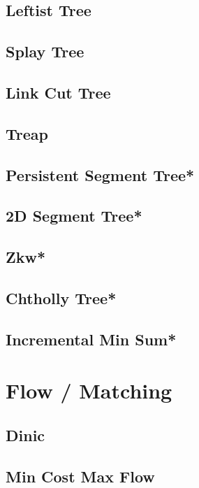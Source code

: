 \subsection{Leftist Tree}

\subsection{Splay Tree}

\subsection{Link Cut Tree}

\subsection{Treap}

\subsection{Persistent Segment Tree*}

\subsection{2D Segment Tree*}

\subsection{Zkw*}

\subsection{Chtholly Tree*}

\subsection{Incremental Min Sum*}


\section{Flow / Matching}
\subsection{Dinic}

\subsection{Min Cost Max Flow}


